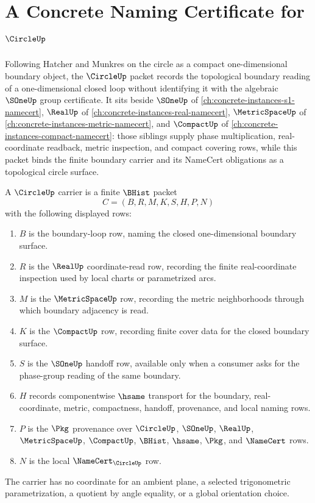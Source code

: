 \chapter{A Concrete Naming Certificate for $\CircleUp$}
\label{ch:concrete-instances-circle-namecert}

Following Hatcher and Munkres on the circle as a compact one-dimensional boundary object, the $\CircleUp$ packet records the topological boundary reading of a one-dimensional closed loop without identifying it with the algebraic $\SOneUp$ group certificate. It sits beside $\SOneUp$ of \autoref{ch:concrete-instances-s1-namecert}, $\RealUp$ of \autoref{ch:concrete-instances-real-namecert}, $\MetricSpaceUp$ of \autoref{ch:concrete-instances-metric-namecert}, and $\CompactUp$ of \autoref{ch:concrete-instances-compact-namecert}: those siblings supply phase multiplication, real-coordinate readback, metric inspection, and compact covering rows, while this packet binds the finite boundary carrier and its NameCert obligations as a topological circle surface.

\begin{definition}
\label{def:circle-carrier}
A $\CircleUp$ carrier is a finite $\BHist$ packet
$$
C=(B,R,M,K,S,H,P,N)
$$
with the following displayed rows:
\begin{enumerate}
\item $B$ is the boundary-loop row, naming the closed one-dimensional boundary surface.
\item $R$ is the $\RealUp$ coordinate-read row, recording the finite real-coordinate inspection used by local charts or parametrized arcs.
\item $M$ is the $\MetricSpaceUp$ row, recording the metric neighborhoods through which boundary adjacency is read.
\item $K$ is the $\CompactUp$ row, recording finite cover data for the closed boundary surface.
\item $S$ is the $\SOneUp$ handoff row, available only when a consumer asks for the phase-group reading of the same boundary.
\item $H$ records componentwise $\hsame$ transport for the boundary, real-coordinate, metric, compactness, handoff, provenance, and local naming rows.
\item $P$ is the $\Pkg$ provenance over $\CircleUp$, $\SOneUp$, $\RealUp$, $\MetricSpaceUp$, $\CompactUp$, $\BHist$, $\hsame$, $\Pkg$, and $\NameCert$ rows.
\item $N$ is the local $\NameCert_{\CircleUp}$ row.
\end{enumerate}
The carrier has no coordinate for an ambient plane, a selected trigonometric parametrization, a quotient by angle equality, or a global orientation choice.
\end{definition}

